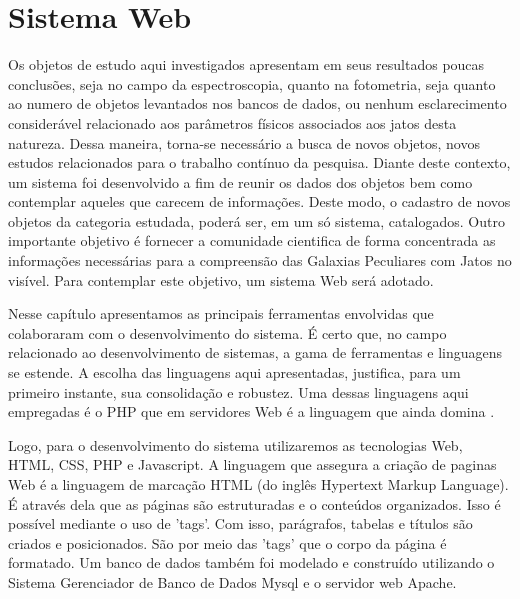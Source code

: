 \chapter{Sistema Web}

Os objetos de estudo aqui investigados apresentam em seus resultados poucas conclusões, seja no campo da espectroscopia, quanto na fotometria, seja quanto ao numero de objetos levantados nos bancos de dados, ou nenhum esclarecimento considerável relacionado aos parâmetros físicos associados aos jatos desta natureza. Dessa maneira, torna-se necessário a busca de novos objetos, novos estudos relacionados para o trabalho contínuo da pesquisa. Diante deste contexto, um sistema foi desenvolvido a fim de reunir os dados dos objetos bem como contemplar aqueles que carecem de informações. Deste modo, o cadastro de novos objetos da categoria estudada, poderá ser, em um só sistema, catalogados. Outro importante objetivo é fornecer a comunidade cientifica de forma concentrada as informações necessárias para a compreensão das Galaxias Peculiares com Jatos no visível. Para contemplar este objetivo, um sistema Web será adotado. 

Nesse capítulo apresentamos as principais ferramentas envolvidas que colaboraram com o desenvolvimento do sistema. É certo que, no campo relacionado ao desenvolvimento de sistemas, a gama de ferramentas e linguagens se estende. A escolha das linguagens aqui apresentadas, justifica, para um primeiro instante,  sua consolidação e robustez. Uma dessas linguagens aqui empregadas é o PHP que em servidores Web é a linguagem que ainda domina \cite{hills2013empirical}.

Logo, para o desenvolvimento do sistema utilizaremos as tecnologias Web, HTML, CSS, PHP e Javascript. A linguagem que assegura a criação de paginas Web é a linguagem de marcação HTML (do inglês Hypertext Markup Language). É através dela que as páginas são estruturadas e o conteúdos organizados. Isso é possível mediante o uso de 'tags'. Com isso, parágrafos, tabelas e títulos são criados e posicionados. São por meio das 'tags' que o corpo da página é formatado. Um banco de dados também foi modelado e construído utilizando o Sistema Gerenciador de Banco de Dados Mysql e o servidor web Apache.


